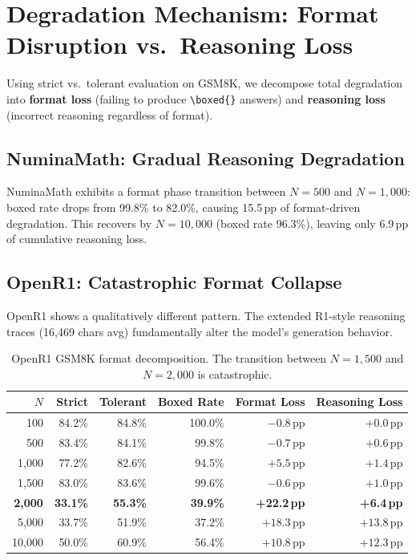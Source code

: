 \documentclass{article}
\begin{document}
\section{Degradation Mechanism: Format Disruption vs.\ Reasoning Loss}
\label{sec:mechanism}

Using strict vs.\ tolerant evaluation on GSM8K, we decompose total degradation into \textbf{format loss} (failing to produce \texttt{\textbackslash boxed\{\}} answers) and \textbf{reasoning loss} (incorrect reasoning regardless of format).

\subsection{NuminaMath: Gradual Reasoning Degradation}

NuminaMath exhibits a format phase transition between $N{=}500$ and $N{=}1{,}000$: boxed rate drops from 99.8\% to 82.0\%, causing 15.5\,pp of format-driven degradation. This recovers by $N{=}10{,}000$ (boxed rate 96.3\%), leaving only 6.9\,pp of cumulative reasoning loss.

\subsection{OpenR1: Catastrophic Format Collapse}

OpenR1 shows a qualitatively different pattern. The extended R1-style reasoning traces (16,469 chars avg) fundamentally alter the model's generation behavior.

\begin{table}[h]
\centering
\caption{OpenR1 GSM8K format decomposition. The transition between $N{=}1{,}500$ and $N{=}2{,}000$ is catastrophic.}
\label{tab:openr1-format}
\small
\begin{tabular}{@{}rrrrrr@{}}
\toprule
$N$ & Strict & Tolerant & Boxed Rate & Format Loss & Reasoning Loss \\
\midrule
100 & 84.2\% & 84.8\% & 100.0\% & $-0.8$\,pp & $+0.0$\,pp \\
500 & 83.4\% & 84.1\% & 99.8\% & $-0.7$\,pp & $+0.6$\,pp \\
1,000 & 77.2\% & 82.6\% & 94.5\% & $+5.5$\,pp & $+1.4$\,pp \\
1,500 & 83.0\% & 83.6\% & 99.6\% & $-0.6$\,pp & $+1.0$\,pp \\
\textbf{2,000} & \textbf{33.1\%} & \textbf{55.3\%} & \textbf{39.9\%} & \textbf{+22.2\,pp} & \textbf{+6.4\,pp} \\
5,000 & 33.7\% & 51.9\% & 37.2\% & $+18.3$\,pp & $+13.8$\,pp \\
10,000 & 50.0\% & 60.9\% & 56.4\% & $+10.8$\,pp & $+12.3$\,pp \\
\bottomrule
\end{tabular}
\end{table}
\end{document}
